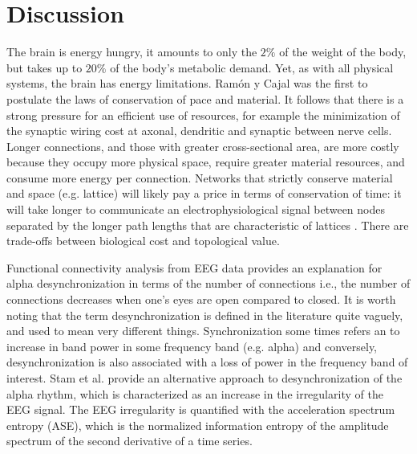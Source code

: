 \documentclass[11pt, onecolumn]{article}
\begin{document}

 
\section{Discussion}

The  brain  is energy  hungry,  it  amounts  to  only the  $2\%$ of the  weight  of the  body,  but  takes  up  to  $20\%$ of the  body's  metabolic demand. Yet, as with all physical systems, the brain has energy limitations. Ram{\'o}n y Cajal was the first to postulate the laws of conservation of pace and material. 
It follows that there is a strong pressure for an efficient use of resources, for example the minimization of the synaptic wiring cost at axonal, dendritic and synaptic between nerve cells.
Longer connections, and those with greater cross-sectional area, are more costly because they occupy more physical space, require greater material resources, and consume more energy per connection. Networks that strictly conserve material and space (e.g. lattice) will likely pay a price in terms of conservation of time: it will take longer to communicate an electrophysiological signal between nodes separated by the longer path lengths that are characteristic of lattices \citep{fornito2016fundamentals}. There are trade-offs between biological cost and topological value.

Functional connectivity analysis from EEG data provides an explanation for alpha desynchronization in terms of the number of connections i.e.,  the number of connections decreases when one's eyes are open compared to closed. It is worth noting that the term desynchronization is defined in the literature quite vaguely, and used to mean very different things. Synchronization some times refers an to increase in band power in some frequency band (e.g. alpha) and conversely, desynchronization is also associated with a loss of power in the frequency band of interest. 
Stam et al.\citep{stam1993quantification} provide an alternative approach to desynchronization of the alpha rhythm, which is characterized as an increase in the irregularity of the EEG signal. The EEG irregularity is quantified with the acceleration spectrum entropy (ASE), which is the normalized information entropy of the amplitude spectrum of the second derivative of a time series.
\end{document}
